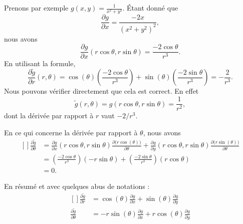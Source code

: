 Prenons par exemple $g(x,y)=\frac{1}{ x^2+y^2 }$. Étant donné que
\begin{equation}
    \frac{ \partial g }{ \partial x }=\frac{ -2x }{ (x^2+y^2)^2 },
\end{equation}
nous avons
\begin{equation}
    \frac{ \partial g }{ \partial x }(r\cos\theta,r\sin\theta)=\frac{ -2\cos\theta }{ r^3 }.
\end{equation}
En utilisant la formule,
\begin{equation}
    \frac{ \partial \tilde g }{ \partial r }(r,\theta)=\cos(\theta)\left( \frac{ -2\cos\theta }{ r^3 } \right)+\sin(\theta)\left( \frac{ -2\sin\theta }{ r^3 } \right)=-\frac{ 2 }{ r^3 }.
\end{equation}
Nous pouvons vérifier directement que cela est correct. En effet
\begin{equation}
    \tilde g(r,\theta)=g(r\cos\theta,r\sin\theta)=\frac{1}{ r^2 },
\end{equation}
dont la dérivée par rapport à $r$ vaut $-2/r^3$.

En ce qui concerne la dérivée par rapport à $\theta$, nous avons
\begin{equation}
    \begin{aligned}[]
    \frac{ \partial \tilde g }{ \partial \theta }&=\frac{ \partial g }{ \partial x }(r\cos\theta,r\sin\theta)\frac{ \partial \big( r\cos(\theta) \big) }{ \partial \theta }+\frac{ \partial g }{ \partial y }(r\cos\theta,r\sin\theta)\frac{ \partial \big( r\sin(\theta) \big) }{ \partial \theta }\\
    &=\left( \frac{ -2\cos\theta }{ r^3 } \right)(-r\sin\theta)+\left( \frac{ -2\sin\theta }{ r^3 } \right)(r\cos\theta)\\
    &=0.
    \end{aligned}
\end{equation}

En résumé et avec quelques abus de notations :
\begin{equation}
    \begin{aligned}[]
        \frac{ \partial \tilde g }{ \partial r }&=\cos(\theta)\frac{ \partial g }{ \partial x }+\sin(\theta)\frac{ \partial g }{ \partial y }\\
        \frac{ \partial \tilde g }{ \partial \theta }&=-r\sin(\theta)\frac{ \partial g }{ \partial x }+r\cos(\theta)\frac{ \partial g }{ \partial y }\\
    \end{aligned}
\end{equation}


